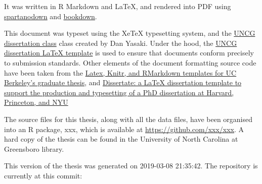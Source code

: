 \documentclass[ms]{uncgdissertationexp}
\theoremstyle{plain}
\theoremstyle{definition}
\theoremstyle{remark}
\begin{document}
  It was written in R Markdown and LaTeX, and rendered into PDF using
  \href{https://github.com/ashley-williams/spartanodown}{spartanodown} and
  \href{https://github.com/rstudio/bookdown}{bookdown}.
  
  This document was typeset using the XeTeX typesetting system, and the
  \href{https://mathstats.uncg.edu/wp-content/uploads/2018/08/uncgdissertationexp.cls}{UNCG
  dissertation class} class created by Dan Yasaki. Under the hood, the
  \href{https://mathstats.uncg.edu/wp-content/uploads/2018/08/sample.tex}{UNCG
  dissertation LaTeX template} is used to ensure that documents conform
  precisely to submission standards. Other elements of the document
  formatting source code have been taken from the
  \href{https://github.com/stevenpollack/ucbthesis}{Latex, Knitr, and
  RMarkdown templates for UC Berkeley's graduate thesis}, and
  \href{https://github.com/suchow/Dissertate}{Dissertate: a LaTeX
  dissertation template to support the production and typesetting of a PhD
  dissertation at Harvard, Princeton, and NYU}
  
  The source files for this thesis, along with all the data files, have
  been organised into an R package, xxx, which is available at
  \url{https://github.com/xxx/xxx}. A hard copy of the thesis can be found
  in the University of North Carolina at Greensboro library.
  
  This version of the thesis was generated on 2019-03-08 21:35:42. The
  repository is currently at this commit:
  
\end{document}
